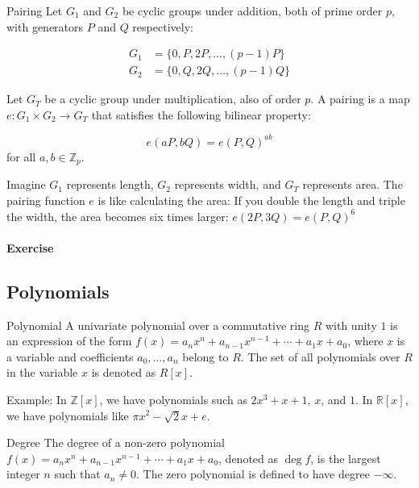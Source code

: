 \documentclass{article}
\begin{document}
\begin{definition}{Pairing}{}
Let $G_1$ and $G_2$ be cyclic groups under addition, both of prime order $p$, with generators $P$ and $Q$ respectively:

    \begin{align}
        G_1 &= \{0, P, 2P, ..., (p-1)P\} \\
        G_2 &= \{0, Q, 2Q, ..., (p-1)Q\}
    \end{align}

Let $G_T$ be a cyclic group under multiplication, also of order $p$.
A pairing is a map $e: G_1 \times G_2 \rightarrow G_T$ that satisfies the following bilinear property:

    \begin{equation}
        e(aP, bQ) = e(P, Q)^{ab}
    \end{equation} for all $a, b \in \mathbb{Z}_p$.
\end{definition}

Imagine $G_1$ represents length, $G_2$ represents width, and $G_T$ represents area. The pairing function $e$ is like calculating the area: If you double the length and triple the width, the area becomes six times larger: $e(2P, 3Q) = e(P, Q)^{6}$

\paragraph{Exercise}

\subsection{Polynomials}

\begin{definition}{Polynomial}{}
    A univariate polynomial over a commutative ring $R$ with unity $1$ is an expression of the form $f(x) = a_n x^{n} + a_{n-1} x^{n-1} + \cdots + a_1 x + a_0$, where $x$ is a variable and coefficients $a_0, \ldots, a_n$ belong to $R$. The set of all polynomials over $R$ in the variable $x$ is denoted as $R[x]$.
\end{definition}

Example: In $\mathbb{Z}[x]$, we have polynomials such as $2x^3 + x + 1$, $x$, and $1$. In $\mathbb{R}[x]$, we have polynomials like $\pi x^2 - \sqrt{2}x + e$.

\begin{definition}{Degree}{}
    The degree of a non-zero polynomial $f(x) = a_n x^{n} + a_{n-1} x^{n-1} + \cdots + a_1 x + a_0$, denoted as $\deg f$, is the largest integer $n$ such that $a_n \neq 0$. The zero polynomial is defined to have degree $-\infty$.
\end{definition}
\end{document}
